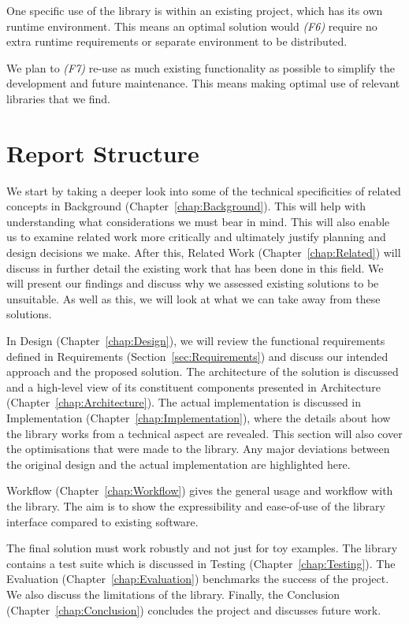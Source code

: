 One specific use of the library is within an existing project, which has its own runtime environment. This means an optimal solution would \emph{(F6)} require no extra runtime requirements or separate environment to be distributed.

We plan to \emph{(F7)} re-use as much existing functionality as possible to simplify the development and future maintenance. This means making optimal use of relevant libraries that we find.

\section{Report Structure}

We start by taking a deeper look into some of the technical specificities of related concepts in Background (Chapter~\ref{chap:Background}). This will help with understanding what considerations we must bear in mind. This will also enable us to examine related work more critically and ultimately justify planning and design decisions we make. After this, Related Work (Chapter~\ref{chap:Related}) will discuss in further detail the existing work that has been done in this field. We will present our findings and discuss why we assessed existing solutions to be unsuitable. As well as this, we will look at what we can take away from these solutions.

In Design (Chapter~\ref{chap:Design}), we will review the functional requirements defined in Requirements (Section~\ref{sec:Requirements}) and discuss our intended approach and the proposed solution. The architecture of the solution is discussed and a high-level view of its constituent components presented in Architecture (Chapter~\ref{chap:Architecture}). The actual implementation is discussed in Implementation (Chapter~\ref{chap:Implementation}), where the details about how the library works from a technical aspect are revealed. This section will also cover the optimisations that were made to the library. Any major deviations between the original design and the actual implementation are highlighted here.

Workflow (Chapter~\ref{chap:Workflow}) gives the general usage and workflow with the library. The aim is to show the expressibility and ease-of-use of the library interface compared to existing software.

The final solution must work robustly and not just for toy examples. The library contains a test suite which is discussed in Testing (Chapter~\ref{chap:Testing}). The Evaluation (Chapter~\ref{chap:Evaluation}) benchmarks the success of the project. We also discuss the limitations of the library. Finally, the Conclusion (Chapter~\ref{chap:Conclusion}) concludes the project and discusses future work.